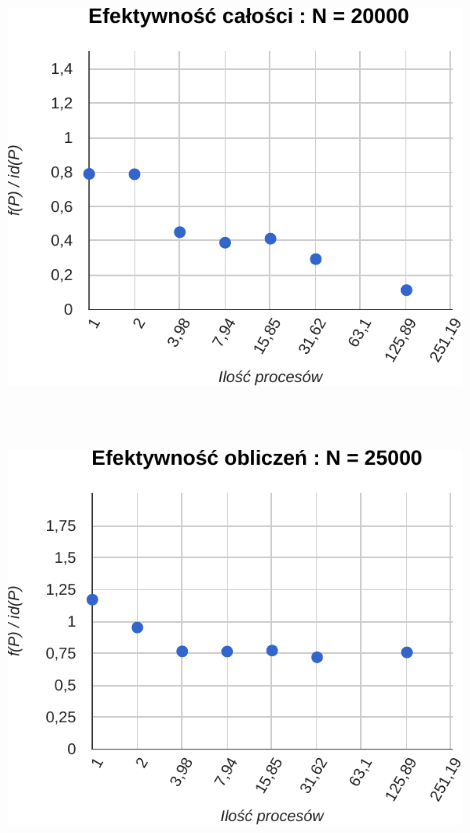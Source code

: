 \documentclass[paper=a4, fontsize=11pt]{scrartcl}	%
\numberwithin{equation}{section}		%
\numberwithin{figure}{section}			%
\numberwithin{table}{section}				%
\begin{document}
\includegraphics[width=120mm]{report/comp-eff-20000.pdf} \\ \ \\ \ \\ \ \\

\includegraphics[width=120mm]{report/comp-eff-25000.pdf} \\ \ \\ \ \\ \ \\
\end{document}
